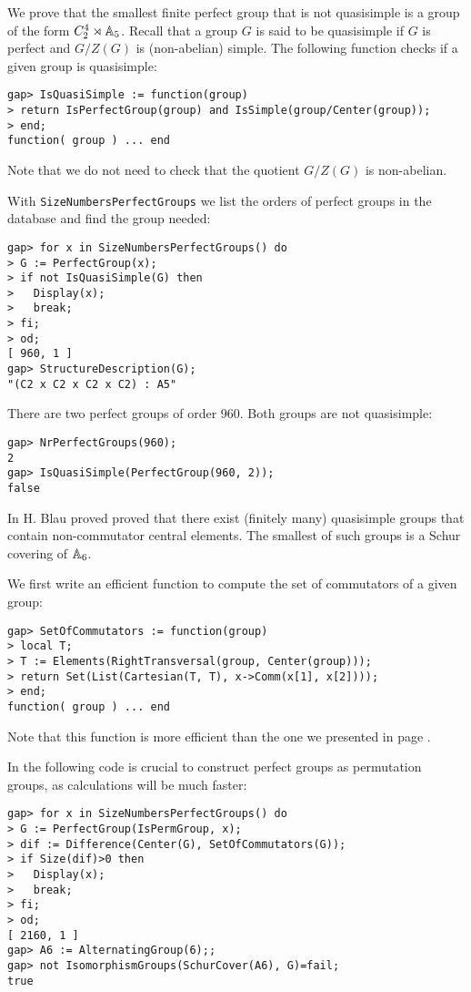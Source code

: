 \begin{example}
We prove that the smallest finite perfect
group that is not quasisimple 
is a group of the form $C_2^4\rtimes\mathbb{A}_5$. 
Recall that a group $G$ is said to be 
quasisimple if $G$ is perfect and 
$G/Z(G)$ is (non-abelian) simple. The following function
checks if a given group is quasisimple:
\begin{lstlisting}
gap> IsQuasiSimple := function(group)
> return IsPerfectGroup(group) and IsSimple(group/Center(group));
> end;
function( group ) ... end
\end{lstlisting}
Note that we do not need to check that
the quotient $G/Z(G)$ is non-abelian. 

With
\lstinline{SizeNumbersPerfectGroups} 
we list the orders of perfect groups in the database
and find the group needed:
\begin{lstlisting}
gap> for x in SizeNumbersPerfectGroups() do
> G := PerfectGroup(x);
> if not IsQuasiSimple(G) then
>   Display(x);
>   break;
> fi;
> od;
[ 960, 1 ]
gap> StructureDescription(G);
"(C2 x C2 x C2 x C2) : A5"
\end{lstlisting}
There are two perfect groups of order 960. Both 
groups are not quasisimple:
\begin{lstlisting}
gap> NrPerfectGroups(960);
2
gap> IsQuasiSimple(PerfectGroup(960, 2));
false
\end{lstlisting}
\end{example}

\begin{example}
\label{ex:Blaucommutators}
In \cite{MR1254833} H. Blau proved 
proved that there exist (finitely many) quasisimple 
groups that contain non-commutator central elements. The 
smallest of such groups is 
a Schur covering of $\mathbb{A}_6$.

We first write an efficient function to compute
the set of commutators of a given group:
\begin{lstlisting}
gap> SetOfCommutators := function(group)
> local T;
> T := Elements(RightTransversal(group, Center(group)));
> return Set(List(Cartesian(T, T), x->Comm(x[1], x[2])));
> end;
function( group ) ... end
\end{lstlisting}
Note that this function is more efficient than 
the one we presented in page \pageref{ex:commutatorElementsS16}. 

In the following
code is crucial to construct perfect groups
as permutation groups, as calculations will be much faster:
\begin{lstlisting}
gap> for x in SizeNumbersPerfectGroups() do
> G := PerfectGroup(IsPermGroup, x);
> dif := Difference(Center(G), SetOfCommutators(G));
> if Size(dif)>0 then
>   Display(x);
>   break;
> fi;
> od;
[ 2160, 1 ]
gap> A6 := AlternatingGroup(6);;
gap> not IsomorphismGroups(SchurCover(A6), G)=fail;
true
\end{lstlisting}
\end{example}

